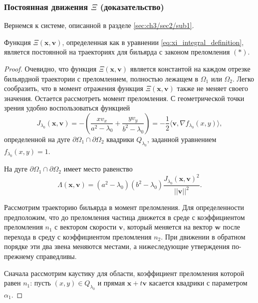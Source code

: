 \subsubsection{Постоянная движения $\Xi$ (доказательство)}\label{sec:ch3/sec2/sub1/sub2}
Вернемся к системе, описанной в разделе \ref{sec:ch3/sec2/sub1}.
\begin{theorem}
    Функция $\Xi(\mathbf{x}, \mathbf{v})$, определенная как в уравнении \eqref{eq:xi_integral_definition}, является постоянной на траекториях для бильярда с законом преломления $(\ast)$.
\label{th:xi_is_integral}
\end{theorem} 
\begin{proof}


Очевидно, что функция $\Xi(\mathbf{x}, \mathbf{v})$ является константой на каждом отрезке бильярдной траектории с преломлением, полностью лежащем в $\Omega_1$ или $\Omega_2$. Легко сообразить, что в момент отражения функция $\Xi(\mathbf{x}, \mathbf{v})$ также не меняет своего значения. Остается рассмотреть  момент преломления. С геометрической точки зрения удобно воспользоваться функцией  
$$J_{\lambda_0}(\mathbf{x}, \mathbf{v}) = -\left(\frac{x v_x}{a^2-\lambda_0} + \frac{y v_y}{b^2-\lambda_0} \right) = -\frac{1}{2}\langle\mathbf{v}, \nabla f_{\lambda_0}(x,y)\rangle,$$
определенной на дуге $\partial \Omega_1 \cap \partial \Omega_2$ квадрики $Q_{\lambda_0}$, заданной уравнением $f_{\lambda_0}(x, y) = 1$.

На дуге  $\partial \Omega_1 \cap \partial \Omega_2$ имеет место равенство
 $$\Lambda(\mathbf{x}, \mathbf{v})=(a^2-\lambda_0)(b^2-\lambda_0)\frac{J_{\lambda_0}(\mathbf{x}, \mathbf{v})^2}{||\mathbf{v}||^2}.$$

Рассмотрим траекторию бильярда в момент преломления. Для определенности предположим, что  до преломления частица движется в среде с коэффициентом преломления $n_1$ с вектором скорости $\mathbf{v}$, который меняется на вектор $\mathbf{w}$ после перехода в среду с коэффициентом преломления $n_2$. При движении в обратном порядке эти два звена меняются местами, а нижеследующие утверждения по-прежнему справедливы.

Сначала рассмотрим каустику для области, коэффициент преломления которой равен $n_1$: пусть $(x,y) \in Q_{\lambda_0}$ и прямая $\mathbf{x}+t \mathbf{v}$ касается квадрики с параметром $\alpha_1$. 



\end{proof}
